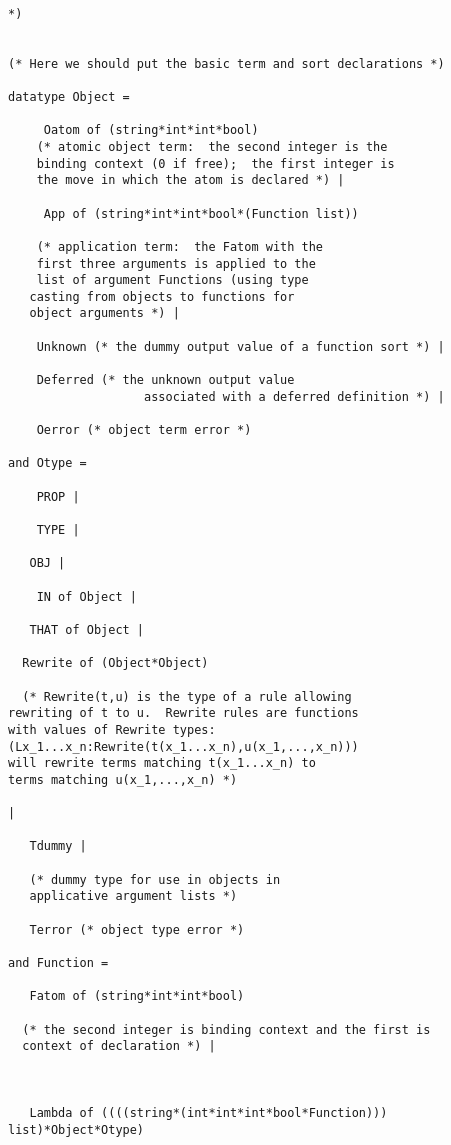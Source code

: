 \documentclass[12pt]{article}
\begin{document}
\begin{verbatim}

*)


(* Here we should put the basic term and sort declarations *)

datatype Object =

     Oatom of (string*int*int*bool)  
    (* atomic object term:  the second integer is the
    binding context (0 if free);  the first integer is
    the move in which the atom is declared *) |

     App of (string*int*int*bool*(Function list)) 

    (* application term:  the Fatom with the 
    first three arguments is applied to the
    list of argument Functions (using type 
   casting from objects to functions for
   object arguments *) |

    Unknown (* the dummy output value of a function sort *) |

    Deferred (* the unknown output value 
                   associated with a deferred definition *) |

    Oerror (* object term error *)

and Otype =

    PROP |

    TYPE |

   OBJ |

    IN of Object |

   THAT of Object |

  Rewrite of (Object*Object)

  (* Rewrite(t,u) is the type of a rule allowing
rewriting of t to u.  Rewrite rules are functions
with values of Rewrite types: 
(Lx_1...x_n:Rewrite(t(x_1...x_n),u(x_1,...,x_n)))
will rewrite terms matching t(x_1...x_n) to
terms matching u(x_1,...,x_n) *)

|
   
   Tdummy |
   
   (* dummy type for use in objects in
   applicative argument lists *)

   Terror (* object type error *)

and Function =

   Fatom of (string*int*int*bool)

  (* the second integer is binding context and the first is
  context of declaration *) |



   Lambda of ((((string*(int*int*int*bool*Function))) list)*Object*Otype) 


\end{verbatim}
\end{document}
